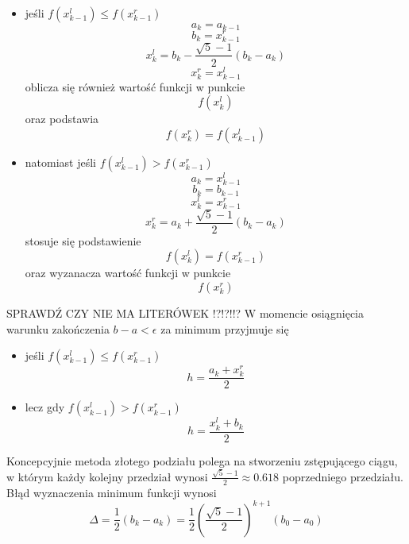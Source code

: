 \begin{itemize}
\item jeśli $f(x^l_{k-1}) \leq f(x^r_{k-1}) $ \newline
	\begin{equation}
	a_k = a_{k-1}
	\end{equation}
	\begin{equation}
	b_k = x^r_{k-1}
	\end{equation}
	\begin{equation}
	x^l_k = b_k - \frac{\sqrt{5} - 1}{2}(b_k - a_k)
	\end{equation}
	\begin{equation}
	x^r_k = x^l_{k-1}
	\end{equation}
	oblicza się również wartość funkcji w punkcie 
	\begin{equation}
	f(x^l_k)
	\end{equation}
	oraz podstawia
	\begin{equation}
	f(x^r_k) = f(x^l_{k-1})
	\end{equation}
\item natomiast jeśli $f(x^l_{k-1}) > f(x^r_{k-1}) $ \newline
	\begin{equation}
	a_k = x^l_{k-1}
	\end{equation}
	\begin{equation}
	b_k = b_{k-1}
	\end{equation}
	\begin{equation}
	x^l_k = x^r_{k-1}
	\end{equation}
	\begin{equation}
	x^r_k = a_k + \frac{\sqrt{5} - 1}{2}(b_k - a_k)
	\end{equation}
	stosuje się podstawienie 
	\begin{equation}
	f(x^l_k) = f(x^r_{k-1})
	\end{equation}
	oraz wyzanacza wartość funkcji w punkcie
	\begin{equation}
	f(x^r_k)
	\end{equation}
\end{itemize}
SPRAWDŹ CZY NIE MA LITERÓWEK !?!?!!?
W momencie osiągnięcia warunku zakończenia $b-a< \epsilon$ za minimum przyjmuje się
\begin{itemize}
\item jeśli $f(x^l_{k-1}) \leq f(x^r_{k-1}) $
	\begin{equation}
	h = \frac{a_k+x^r_k}{2}
	\end{equation}
\item lecz gdy $f(x^l_{k-1}) > f(x^r_{k-1}) $
	\begin{equation}
	h = \frac{x^l_k + b_k}{2}
	\end{equation}
\end{itemize}
Koncepcyjnie metoda złotego podziału polega na stworzeniu zstępującego ciągu, w którym każdy kolejny przedział wynosi $\frac{\sqrt{5} - 1}{2} \approx 0.618$ poprzedniego przedziału. Błąd wyznaczenia minimum funkcji wynosi
\begin{equation}
\Delta = \frac{1}{2}(b_k - a_k) = \frac{1}{2} {(\frac{\sqrt{5} - 1}{2})}^{k+1}(b_0-a_0)
\end{equation}

